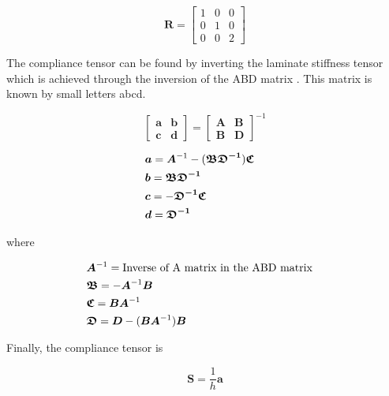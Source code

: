 \documentclass{article}
\begin{document}
\begin{equation}
    \bm{R} = \begin{bmatrix}
        1 & 0 & 0 \\ 
        0 & 1 & 0\\
        0 & 0 & 2
    \end{bmatrix}
    \label{eq:R}
\end{equation}

The compliance tensor can be found by inverting the laminate stiffness tensor which is achieved through the inversion of the ABD matrix \cite{Daniel2006}. This matrix is known by small letters abcd.

\begin{equation*}
    \begin{bmatrix}
        \bm{a} & \bm{b} \\ 
        \bm{c} & \bm{d}
    \end{bmatrix} =
    \begin{bmatrix}
        \bm{A} & \bm{B} \\ 
        \bm{B} & \bm{D}
    \end{bmatrix}^{-1}
\end{equation*}

\begin{align}
    &\bm{a} = \bm{A}^{-1} - (\bm{\mathfrak{B}} \bm{\mathfrak{D}^{-1}}) \bm{\mathfrak{C}} &\notag \\
    &\bm{b} = \bm{\mathfrak{B}} \bm{\mathfrak{D}^{-1}}  &\notag \\
    &\bm{c} = -\bm{\mathfrak{D}^{-1}} \bm{\mathfrak{C}}  &\notag \\
    &\bm{d} = \bm{\mathfrak{D}^{-1}}  &
    \label{eq:abd}
\end{align}

where

\begin{align*}
    &\bm{A}^{-1} = \text{Inverse of A matrix in the ABD matrix} &\notag \\
    &\bm{\mathfrak{B}} = -\bm{A}^{-1} \bm{B}  &\notag \\
    &\bm{\mathfrak{C}} = \bm{B} \bm{A}^{-1}  &\notag \\
    &\bm{\mathfrak{D}} = \bm{D} - (\bm{B} \bm{A}^{-1}) \bm{B}  &
    \label{eq:abd}
\end{align*}

Finally, the compliance tensor is 

\begin{equation}
    \bm{S} = \dfrac{1}{h} \bm{a}
    \label{eq:compliance_tensor}
\end{equation}
\end{document}
